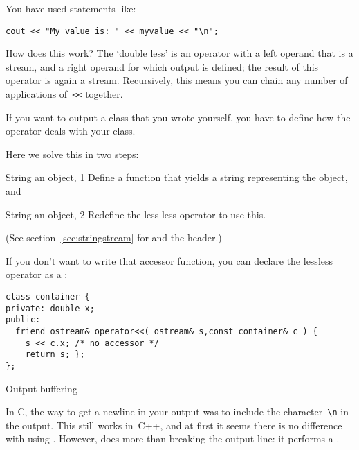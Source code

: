 You have used statements like:
\begin{verbatim}
cout << "My value is: " << myvalue << "\n";
\end{verbatim}
How does this work? The `double less' is an operator with a left
operand that is a stream, and a right operand for which output is
defined; the result of this operator is again a stream. Recursively,
this means you can chain any number of applications of~\verb+<<+
together.

  If you want to output a class that you wrote yourself, you have to
  define how the \n{<<} operator deals with your class.

Here we solve this in two steps:

\begin{block}{String an object, 1}
  \label{sl:class-cout1}
 Define a function that yields a string representing the object, and 

  \lstset{style=snippetcode}
\end{block}

\begin{block}{String an object, 2}
  \label{sl:class-cout2}
  Redefine the less-less operator to use this.

  \lstset{style=snippetcode}
\end{block}

(See section~\ref{sec:stringstream} for  and the
 header.)


If you don't want to write that accessor function, you can declare
the lessless operator as a :
\begin{lstlisting}
class container {
private: double x;
public:
  friend ostream& operator<<( ostream& s,const container& c ) {
    s << c.x; /* no accessor */
    return s; };
};
\end{lstlisting}

 {Output buffering}
\label{sec:to-endl-or-not}

In C, the way to get a newline in your output was to include the
character~\verb+\n+ in the output. This still works in~C++, and at
first it seems there is no difference with using . However,
 does more than breaking the output line: it
performs a .

